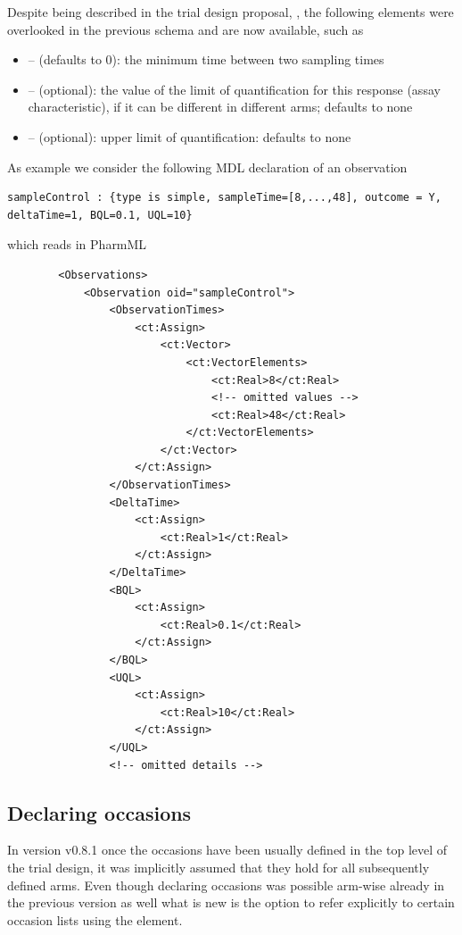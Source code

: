 Despite being described in the trial design proposal, \cite{Commets2015}, 
the following elements were overlooked in the previous schema and are now 
available, such as 

\begin{itemize}
\item 
{} -- (defaults to 0): the minimum time between two sampling times
\item 
{} -- (optional): the value of the limit of quantification for this response 
(assay characteristic), if it can be different in different arms; defaults to none
\item 
{} -- (optional): upper limit of quantification: defaults to none
\end{itemize}
\smallskip
As example we consider the following MDL declaration of an observation 
\lstset{language=MLX}
\begin{lstlisting}
sampleControl : {type is simple, sampleTime=[8,...,48], outcome = Y, deltaTime=1, BQL=0.1, UQL=10}
\end{lstlisting}
which reads in PharmML
\lstset{language=XML}
\begin{lstlisting}
        <Observations>
            <Observation oid="sampleControl">
                <ObservationTimes>
                    <ct:Assign>
                        <ct:Vector>
                            <ct:VectorElements>
                                <ct:Real>8</ct:Real>
                                <!-- omitted values -->
                                <ct:Real>48</ct:Real>
                            </ct:VectorElements>
                        </ct:Vector>
                    </ct:Assign>
                </ObservationTimes>
                <DeltaTime>
                    <ct:Assign>
                        <ct:Real>1</ct:Real>
                    </ct:Assign>
                </DeltaTime>
                <BQL>
                    <ct:Assign>
                        <ct:Real>0.1</ct:Real>
                    </ct:Assign>
                </BQL>
                <UQL>
                    <ct:Assign>
                        <ct:Real>10</ct:Real>
                    </ct:Assign>
                </UQL>
                <!-- omitted details -->
\end{lstlisting}



\subsection{Declaring occasions}
\label{subsec:declOccs}
In version v0.8.1 once the occasions have been usually defined in the top level of the 
trial design, it was implicitly assumed that they hold for all subsequently defined arms. 
Even though declaring occasions was possible arm-wise already in the previous 
version as well what is new is the option to refer explicitly to certain occasion lists 
using the  element. 


